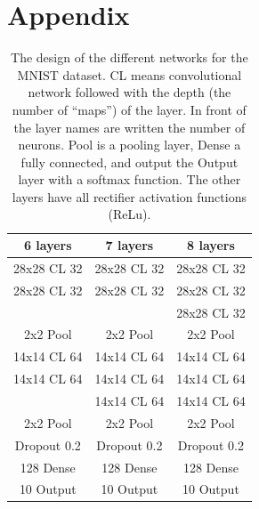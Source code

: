 \documentclass[%
 reprint,
 amsmath,amssymb,
 aps,
]{revtex4-1}
\begin{document}


\section*{Appendix}

\begin{table}
\begin{tabular}{c | c | c}
6 layers & 7 layers & 8 layers  \\ \hline\hline
28x28 CL 32 & 28x28 CL 32 & 28x28 CL 32 \\
28x28 CL 32 & 28x28 CL 32 & 28x28 CL 32 \\
 &   & 28x28 CL 32 \\
2x2 Pool & 2x2 Pool & 2x2 Pool \\
14x14 CL 64 & 14x14 CL 64 & 14x14 CL 64\\
14x14 CL 64 & 14x14 CL 64 & 14x14 CL 64\\
 & 14x14 CL 64 & 14x14 CL 64\\
2x2 Pool & 2x2 Pool  & 2x2 Pool \\
Dropout 0.2 & Dropout 0.2 & Dropout 0.2\\
128 Dense & 128  Dense& 128 Dense\\
10 Output & 10 Output & 10 Output
\end{tabular}
\caption{The design of the different networks for the MNIST dataset. CL means convolutional network followed with the depth (the number of ``maps'') of the layer.  In front of the layer names are written the number of neurons. Pool is a pooling layer, Dense a fully connected, and output the Output layer with a softmax function. The other layers have all rectifier activation functions (ReLu).}
\label{tab:mnist_netw}
\end{table}
\end{document}
